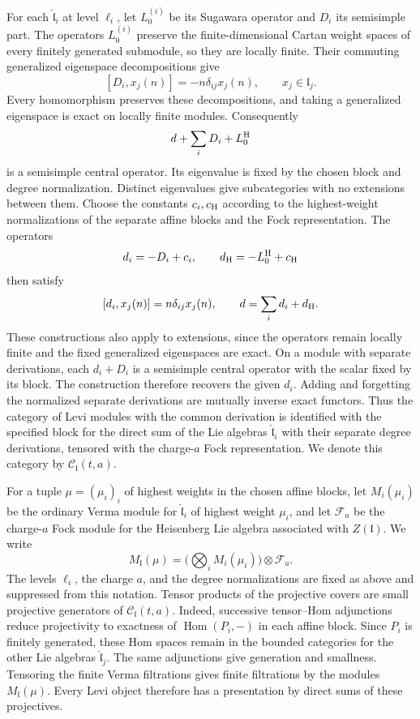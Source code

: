 \documentclass[11pt,a4paper]{amsart}
\numberwithin{equation}{section}
\theoremstyle{definition}
\theoremstyle{remark}
\newcommand{\lev}{\mathfrak l}
\begin{document}
For each $\widehat{\lev}_i$ at level $\ell_i$, let $L^{(i)}_0$ be its Sugawara
operator and $D_i$ its semisimple part. The operators $L^{(i)}_0$
preserve the finite-dimensional Cartan weight spaces of every
finitely generated submodule, so they are locally finite. Their
commuting generalized eigenspace decompositions give
$$
 [D_i,x_j(n)]=-n\delta_{ij}x_j(n),\qquad x_j\in\lev_j.
$$
Every homomorphism preserves these decompositions, and taking a
generalized eigenspace is exact on locally finite modules.
Consequently
$$
 d+\sum_iD_i+L^{\rm H}_0
$$
is a semisimple central operator. Its eigenvalue is fixed by the
chosen block and degree normalization. Distinct eigenvalues give
subcategories with no extensions between them. Choose the constants
$c_i,c_{\rm H}$ according to the highest-weight normalizations of
the separate affine blocks and the Fock representation. The operators
$$
 d_i=-D_i+c_i,\qquad d_{\rm H}=-L^{\rm H}_0+c_{\rm H}
$$
then satisfy
$$
 [d_i,x_j(n)]=n\delta_{ij}x_j(n),\qquad
 d=\sum_i d_i+d_{\rm H}.
$$
These constructions also apply to extensions, since the operators
remain locally finite and the fixed generalized eigenspaces are exact.
On a module with separate derivations, each $d_i+D_i$ is a
semisimple central operator with the scalar fixed by its block.
The construction therefore recovers the given $d_i$.
Adding and forgetting the normalized separate derivations are mutually
inverse exact functors. Thus the category of Levi modules with the
common derivation is identified with the specified block for the
direct sum of the Lie algebras $\widehat{\lev}_i$ with their
separate degree derivations, tensored with
the charge-$a$ Fock representation. We denote this
category by $\mathcal C_\lev(t,a)$.

For a tuple $\mu=(\mu_i)_i$ of highest weights in the chosen affine
blocks, let $M_i(\mu_i)$ be the ordinary Verma module for
$\widehat{\lev}_i$ of highest weight $\mu_i$, and let $\mathcal F_a$
be the charge-$a$ Fock module for the Heisenberg Lie algebra associated
with $Z(\lev)$. We write
$$
 M_\lev(\mu)=\biggl(\bigotimes_i M_i(\mu_i)\biggr)\otimes\mathcal F_a.
$$
The levels $\ell_i$, the charge $a$, and the degree normalizations are
fixed as above and suppressed from this notation.
Tensor products of the projective covers are small projective
generators of $\mathcal C_\lev(t,a)$. Indeed, successive tensor--Hom
adjunctions reduce projectivity to exactness of
$\operatorname{Hom}(P_i,-)$ in each affine block. Since $P_i$ is
finitely generated, these Hom spaces remain in the bounded categories
for the other Lie algebras $\widehat{\lev}_j$. The same adjunctions give generation
and smallness. Tensoring the finite Verma filtrations gives finite
filtrations by the modules $M_\lev(\mu)$. Every Levi object therefore
has a presentation by direct sums of these projectives.
\end{document}
